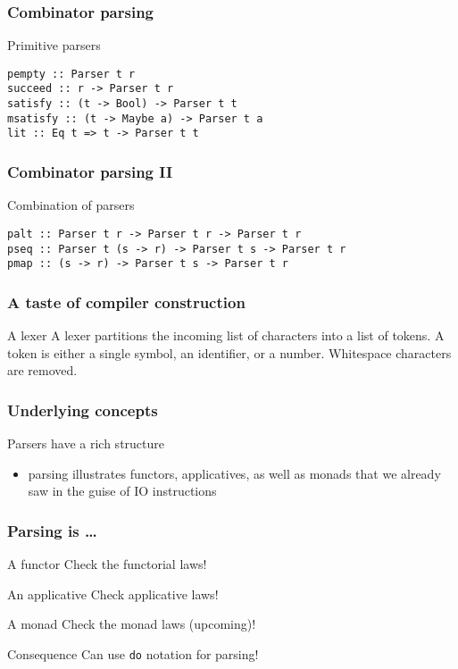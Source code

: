 \documentclass{beamer}
\begin{document}
\begin{frame}[fragile]
  \frametitle{Combinator parsing}
  \begin{block}{Primitive parsers}
\begin{lstlisting}
pempty :: Parser t r
succeed :: r -> Parser t r
satisfy :: (t -> Bool) -> Parser t t
msatisfy :: (t -> Maybe a) -> Parser t a
lit :: Eq t => t -> Parser t t
\end{lstlisting}
  \end{block}
\end{frame}

\begin{frame}[fragile]
  \frametitle{Combinator parsing II}
  \begin{block}{Combination of parsers}
\begin{lstlisting}
palt :: Parser t r -> Parser t r -> Parser t r
pseq :: Parser t (s -> r) -> Parser t s -> Parser t r
pmap :: (s -> r) -> Parser t s -> Parser t r
\end{lstlisting}
\end{block}     
\end{frame}             


\begin{frame}[fragile]
  \frametitle{A taste of compiler construction}
\begin{block}{A lexer}
 A lexer partitions the incoming list of
 characters into a list of tokens. A token is either a single symbol, 
 an identifier, or a number. Whitespace characters are removed.
\end{block}
\end{frame}     


\begin{frame}[fragile]
  \frametitle{Underlying concepts}
  \begin{alertblock}{Parsers have a rich structure}
    \begin{itemize}
    \item parsing illustrates functors, applicatives, as well as
      monads that we already saw in the guise of IO instructions
    \end{itemize}
  \end{alertblock}
\end{frame}             

\begin{frame}[fragile]
  \frametitle{Parsing is \dots}
  \begin{block}{A functor}
    Check the functorial laws!
  \end{block}
  \begin{block}{An applicative}
    Check applicative laws!
  \end{block}
  \begin{block}{A monad}
    Check the monad laws (upcoming)!
  \end{block}
  \begin{alertblock}{Consequence}
    Can use \texttt{do} notation for parsing!
  \end{alertblock}
\end{frame}
\end{document}
